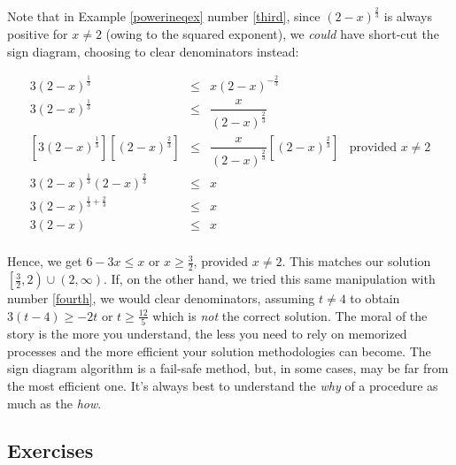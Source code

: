 \documentclass{ximera}
\begin{document}
\newpage

Note that in Example \ref{powerineqex} number \ref{third}, since $(2-x)^{\frac{2}{3}}$ is always positive  for $x \neq 2$ (owing to the squared exponent), we \textit{could} have short-cut the sign diagram, choosing to  clear denominators instead:

\[ \begin{array}{rclr}

3 (2-x)^{\frac{1}{3}} & \leq & x (2-x)^{-\frac{2}{3}} & \\

3 (2-x)^{\frac{1}{3}} & \leq & \dfrac{x}{(2-x)^{\frac{2}{3}}} & \\

\left[3 (2-x)^{\frac{1}{3}} \right] \left[  (2-x)^{\frac{2}{3}}\right]& \leq & \dfrac{x}{(2-x)^{\frac{2}{3}}}  \left[  (2-x)^{\frac{2}{3}}\right]&  \text{provided $x \neq 2$} \\
3 (2-x)^{\frac{1}{3}} (2-x)^{\frac{2}{3}} & \leq & x&  \\

3 (2-x)^{\frac{1}{3}+\frac{2}{3}} & \leq & x& \\

3(2-x) & \leq & x  & \\ \end{array} \]

Hence, we get $6-3x \leq x$ or $x \geq \frac{3}{2}$, provided $x \neq 2$. This matches our solution $\left[\frac{3}{2},2\right) \cup (2, \infty)$.  If, on the other hand, we tried this same manipulation with number \ref{fourth}, we would clear denominators, assuming $t \neq 4$ to obtain $3(t-4) \geq -2t$ or $t \geq \frac{12}{5}$ which is \textit{not} the correct solution.  The moral of the story is the more you understand, the less you need to rely on memorized processes and the more efficient your solution methodologies can become.  The sign diagram algorithm is a fail-safe method, but, in some cases, may be far from the most efficient one.  It's always best to understand the \textit{why} of a procedure as much as the \textit{how}.  

\newpage

\subsection{Exercises}


\closegraphsfile
\end{document}
